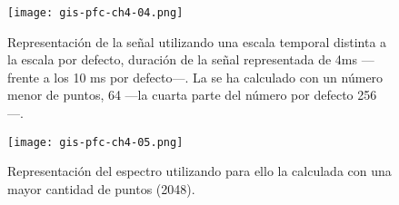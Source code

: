 \begin{figure}\ContinuedFloat
    \begin{center}
	\texttt{[image: gis-pfc-ch4-04.png]}
    \end{center}
    \caption{Representación de la señal utilizando una escala temporal
    distinta a la escala por defecto, duración de la señal representada de
    4ms ---frente a los 10 ms por defecto---. La  se ha calculado
    con un número menor de puntos, 64 ---la cuarta parte del número por
    defecto 256---.}
    \label{fig:test4}
\end{figure}

\begin{figure}\ContinuedFloat
    \begin{center}
	\texttt{[image: gis-pfc-ch4-05.png]}
    \end{center}
    \caption{Representación del espectro utilizando para ello la
     calculada con una mayor cantidad de puntos (2048).}
    \label{fig:test5}
\end{figure}
